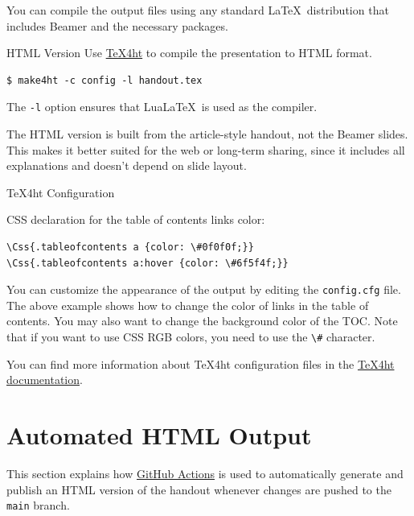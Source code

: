 You can compile the output files using any standard \LaTeX\ distribution that includes Beamer and the necessary packages.

\begin{frame}[fragile]{HTML Version}
  Use \href{https://www.tug.org/tex4ht/}{\TeX4ht} to compile the presentation to HTML format. 
\begin{verbatim}
$ make4ht -c config -l handout.tex    
\end{verbatim}

The \verb|-l| option  ensures that Lua\LaTeX\ is used as the compiler. 
\end{frame}


The HTML version is built from the article-style handout, not the Beamer slides.
This makes it better suited for the web or long-term sharing, since it includes
all explanations and doesn’t depend on slide layout.

\begin{frame}[fragile]{\TeX4ht Configuration}

\begin{block}{}
CSS declaration for the table of contents links color:
\end{block}
  
\begin{verbatim}
\Css{.tableofcontents a {color: \#0f0f0f;}}
\Css{.tableofcontents a:hover {color: \#6f5f4f;}}
\end{verbatim}
\end{frame}

You can customize the appearance of the output by editing the \texttt{config.cfg} file.
The above example shows how to change the color of links in the table of contents.
You may also want to change the background color of the TOC. Note that 
if you want to use CSS RGB colors, you need to use the \verb|\#| character.

You can find more information about \TeX4ht configuration files in the 
\href{https://www.kodymirus.cz/tex4ht-doc/Configurations.html}{\TeX4ht documentation}.


\section{Automated HTML Output}

This section explains how \href{https://docs.github.com/en/actions/writing-workflows/quickstart}{GitHub Actions}
is used to automatically generate and publish an HTML version of the handout whenever changes are pushed to the \texttt{main} branch.

